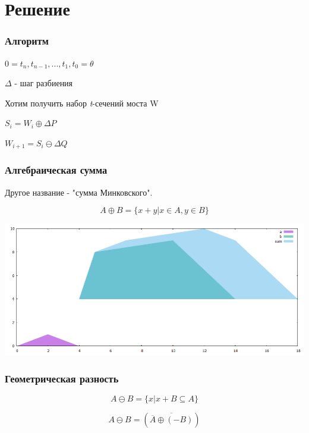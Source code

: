 \documentclass{beamer}
\begin{document}
  
  \section{Решение}
  
  
  \begin{frame}
    \frametitle{Алгоритм}

    $0=t_n, t_{n-1}, ..., t_1, t_0=\theta$

    $\Delta$ - шаг разбиения 

    Хотим получить набор \textit{t}-сечений моста W

    $S_i = W_i \oplus \Delta P$
    
    $W_{i+1} = S_i \ominus \Delta  Q$

  \end{frame}
  

  
  \begin{frame}
    \frametitle{Алгебраическая сумма}
    
    Другое название - "сумма Минковского". 
    
    \begin{equation}
      A \oplus B =  \{ x + y | x \in A, y \in B \} 
    \end{equation}

    \includegraphics[width=1.0\textwidth]{minkowski_sum}
  
  \end{frame}
  
  
  \begin{frame}
    \frametitle{Геометрическая разность}
    
    \begin{equation}
      A \ominus B =  \{ x | x + B \subseteq A \} 
    \end{equation}

    \begin{equation}
        A \ominus B =
        (\overline{\overline{A} \oplus (- B)})
    \end{equation}    

  \end{frame}
  
\end{document}

